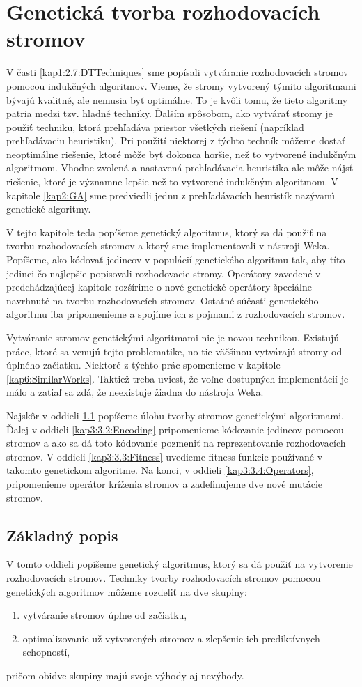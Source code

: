 \chapter{Genetická tvorba rozhodovacích stromov}\label{kap3:DTGA}
V časti \ref{kap1:2.7:DTTechniques} sme popísali vytváranie rozhodovacích stromov pomocou indukčných algoritmov. Vieme, že stromy vytvorený týmito algoritmami bývajú kvalitné, ale nemusia byť optimálne. To je kvôli tomu, že tieto algoritmy patria medzi tzv. hladné techniky. Ďalším spôsobom, ako vytvárať stromy je použiť techniku, ktorá prehľadáva priestor všetkých riešení (napríklad prehľadávaciu heuristiku). Pri použití niektorej z týchto techník môžeme dostať neoptimálne riešenie, ktoré môže byť dokonca horšie, než to vytvorené indukčným algoritmom. Vhodne zvolená a nastavená prehľadávacia heuristika ale môže nájsť riešenie, ktoré je významne lepšie než to vytvorené indukčným algoritmom. V kapitole \ref{kap2:GA} sme predviedli jednu z prehľadávacích heuristík nazývanú genetické algoritmy.

V tejto kapitole teda popíšeme genetický algoritmus, ktorý sa dá použiť na tvorbu rozhodovacích stromov a ktorý sme implementovali v nástroji Weka. Popíšeme, ako kódovať jedincov v populácií genetického algoritmu tak, aby títo jedinci čo najlepšie popisovali rozhodovacie stromy. Operátory zavedené v predchádzajúcej kapitole rozšírime o nové genetické operátory špeciálne navrhnuté na tvorbu rozhodovacích stromov. Ostatné súčasti genetického algoritmu iba pripomenieme a spojíme ich s pojmami z rozhodovacích stromov.

Vytváranie stromov genetickými algoritmami nie je novou technikou. Existujú práce, ktoré sa venujú tejto problematike, no tie väčšinou vytvárajú stromy od úplného začiatku. Niektoré z týchto prác spomenieme v kapitole \ref{kap6:SimilarWorks}. Taktiež treba uviesť, že voľne dostupných implementácií je málo a zatiaľ sa zdá, že neexistuje žiadna do nástroja Weka.

Najskôr v oddieli \ref{kap3:3.1:Intro} popíšeme úlohu tvorby stromov genetickými algoritmami. Ďalej v oddieli \ref{kap3:3.2:Encoding} pripomenieme kódovanie jedincov pomocou stromov a ako sa dá toto kódovanie pozmeniť na reprezentovanie rozhodovacích stromov. V oddieli \ref{kap3:3.3:Fitness} uvedieme fitness funkcie používané v takomto genetickom algoritme. Na konci, v oddieli \ref{kap3:3.4:Operators}, pripomenieme operátor kríženia stromov a zadefinujeme dve nové mutácie stromov.
\section{Základný popis}\label{kap3:3.1:Intro}
V tomto oddieli popíšeme genetický algoritmus, ktorý sa dá použiť na vytvorenie rozhodovacích stromov. Techniky tvorby rozhodovacích stromov pomocou genetických algoritmov môžeme rozdeliť na dve skupiny:
\begin{enumerate}
\item vytváranie stromov úplne od začiatku,
\item optimalizovanie už vytvorených stromov a zlepšenie ich prediktívnych schopností,
\end{enumerate}
pričom obidve skupiny majú svoje výhody aj nevýhody.

